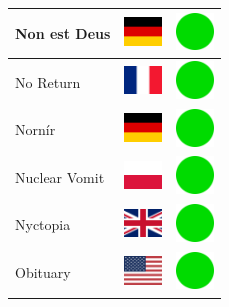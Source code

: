 \documentclass[12pt, a4paper, twoside]{report}
\begin{document}
\begin{center}
\begin{longtable}{|p{5cm}|p{2cm}|p{2cm}|}
 Non est Deus                                               & \includegraphics[width=1cm]{../img/flags/de} &   \includegraphics[width=1cm]{../likes/y} \\ \hline
 No Return                                                  & \includegraphics[width=1cm]{../img/flags/fr} &   \includegraphics[width=1cm]{../likes/y} \\ \hline
 Nornír                                                     & \includegraphics[width=1cm]{../img/flags/de} &   \includegraphics[width=1cm]{../likes/y} \\ \hline
 Nuclear Vomit                                              & \includegraphics[width=1cm]{../img/flags/pl} &   \includegraphics[width=1cm]{../likes/y} \\ \hline
 Nyctopia                                                   & \includegraphics[width=1cm]{../img/flags/gb} &   \includegraphics[width=1cm]{../likes/y} \\ \hline
 Obituary                                                   & \includegraphics[width=1cm]{../img/flags/us} &   \includegraphics[width=1cm]{../likes/y} \\ \hline

\end{longtable}
\end{center}
\end{document}
